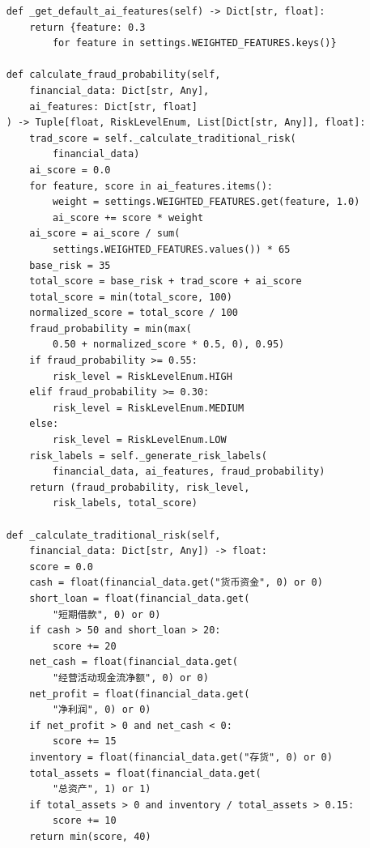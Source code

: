 \documentclass[a4paper,10pt]{article}
\begin{document}
\begin{lstlisting}
    def _get_default_ai_features(self) -> Dict[str, float]:
        return {feature: 0.3
            for feature in settings.WEIGHTED_FEATURES.keys()}

    def calculate_fraud_probability(self,
        financial_data: Dict[str, Any],
        ai_features: Dict[str, float]
    ) -> Tuple[float, RiskLevelEnum, List[Dict[str, Any]], float]:
        trad_score = self._calculate_traditional_risk(
            financial_data)
        ai_score = 0.0
        for feature, score in ai_features.items():
            weight = settings.WEIGHTED_FEATURES.get(feature, 1.0)
            ai_score += score * weight
        ai_score = ai_score / sum(
            settings.WEIGHTED_FEATURES.values()) * 65
        base_risk = 35
        total_score = base_risk + trad_score + ai_score
        total_score = min(total_score, 100)
        normalized_score = total_score / 100
        fraud_probability = min(max(
            0.50 + normalized_score * 0.5, 0), 0.95)
        if fraud_probability >= 0.55:
            risk_level = RiskLevelEnum.HIGH
        elif fraud_probability >= 0.30:
            risk_level = RiskLevelEnum.MEDIUM
        else:
            risk_level = RiskLevelEnum.LOW
        risk_labels = self._generate_risk_labels(
            financial_data, ai_features, fraud_probability)
        return (fraud_probability, risk_level,
            risk_labels, total_score)

    def _calculate_traditional_risk(self,
        financial_data: Dict[str, Any]) -> float:
        score = 0.0
        cash = float(financial_data.get("货币资金", 0) or 0)
        short_loan = float(financial_data.get(
            "短期借款", 0) or 0)
        if cash > 50 and short_loan > 20:
            score += 20
        net_cash = float(financial_data.get(
            "经营活动现金流净额", 0) or 0)
        net_profit = float(financial_data.get(
            "净利润", 0) or 0)
        if net_profit > 0 and net_cash < 0:
            score += 15
        inventory = float(financial_data.get("存货", 0) or 0)
        total_assets = float(financial_data.get(
            "总资产", 1) or 1)
        if total_assets > 0 and inventory / total_assets > 0.15:
            score += 10
        return min(score, 40)


\end{lstlisting}
\end{document}
